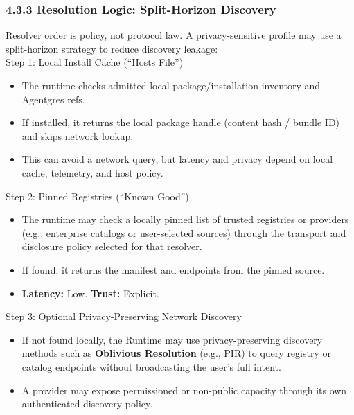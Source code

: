 \documentclass[
  11pt,
]{article}
\begin{document}
\hypertarget{resolution-logic-split-horizon-discovery}{%
\subsubsection{4.3.3 Resolution Logic: Split-Horizon
Discovery}\label{resolution-logic-split-horizon-discovery}}

Resolver order is policy, not protocol law. A privacy-sensitive profile may use
a split-horizon strategy to reduce discovery leakage:\\

Step 1: Local Install Cache (``Hosts File'')

\begin{itemize}
\item
  The runtime checks admitted local package/installation inventory and
  Agentgres refs.
\item
  If installed, it returns the local package handle (content hash /
  bundle ID) and skips network lookup.
\item
  This can avoid a network query, but latency and privacy depend on local cache,
  telemetry, and host policy.
\end{itemize}

Step 2: Pinned Registries (``Known
Good'')\protect\hypertarget{anchor}{}{}

\begin{itemize}
\item
  The runtime may check a locally pinned list of trusted registries or
  providers (e.g., enterprise catalogs or user-selected sources) through the
  transport and disclosure policy selected for that resolver.
\item
  If found, it returns the manifest and endpoints from the pinned
  source.
\item
  \textbf{Latency:} Low. \textbf{Trust:} Explicit.
\end{itemize}

Step 3: Optional Privacy-Preserving Network Discovery

\begin{itemize}
\item
  If not found locally, the Runtime may use privacy-preserving discovery
  methods such as \textbf{Oblivious Resolution} (e.g., PIR) to query
  registry or catalog endpoints without broadcasting the user's full
  intent.
\item
  A provider may expose permissioned or non-public capacity through its own
  authenticated discovery policy.
\end{itemize}
\end{document}
